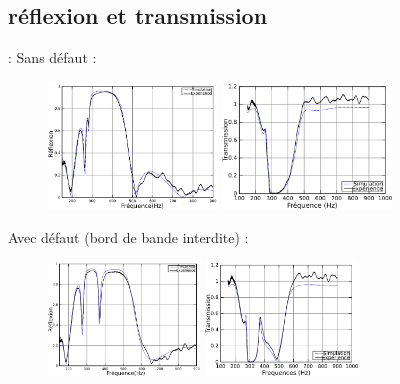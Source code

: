 \documentclass[12pt,xcolor=x11names,compress, notes=show]{beamer}%
\begin{document}
\subsection{réflexion et transmission}
\begin{frame}{\insertsectionhead : \insertsubsectionhead}
Sans défaut :
\begin{figure}
\centering
\includegraphics[width=0.4\textwidth]{R_5HR165_nodefect}
\includegraphics[width=0.4\textwidth]{T_5HR165_nodefect.png}
\end{figure}

Avec défaut (bord de bande interdite) : 
\begin{figure}
\centering
\includegraphics[width=0.36\textwidth]{R_5HR165_8cm_pos3.png}
\includegraphics[width=0.36\textwidth]{T_5HR165_8cm_pos3.png}
\end{figure}


\end{frame}
\end{document}
